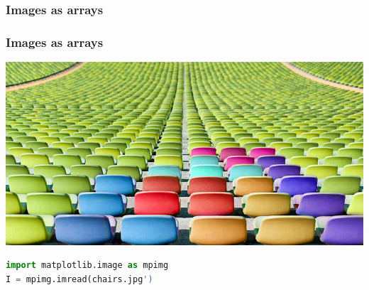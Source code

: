 \begin{frame}
  \frametitle{Images as arrays}

  \begin{center}
  \end{center}

\end{frame}

\begin{frame}[fragile]
  \frametitle{Images as arrays}

  \begin{center}
  \includegraphics[width=\textwidth]{../../code/image_data/chairs.jpg}
  \end{center}

    \begin{block}{}
        \begin{lstlisting}[language=python]
import matplotlib.image as mpimg
I = mpimg.imread(chairs.jpg')
        \end{lstlisting}
    \end{block}

\end{frame}
